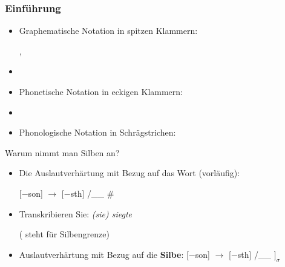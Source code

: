 \begin{frame}
\frametitle{Einführung}


\begin{itemize}
	\item Graphematische Notation in spitzen Klammern: 
	
	  \ea
          , 
          \z
          
	\item[]	
	\item Phonetische Notation in eckigen Klammern:
	
	  \ea
          \textipa{[nO5t.vInt]}
	  \z
          
	\item[]
	\item Phonologische Notation in Schrägstrichen:
	
	  \ea
	  \z
\end{itemize}

\end{frame}



\begin{frame}


Warum nimmt man Silben an?

\begin{itemize}
	\item Die Auslautverhärtung mit Bezug auf das Wort (vorläufig):
	
	  \ea
             {}[$-$son] $\rightarrow$ [$-$sth] /\_\_ \#
	     \z
	\item Transkribieren Sie: \emph{(sie) siegte}

\pause	
\ea
\textipa{[zi:k . t@]} ( steht für Silbengrenze)
\z

\pause
	\eal 
	\ex \textipa{[St\textscr e:p.za:m]} \vs \textipa{[St\textscr e:.b5]}
	\ex {} \vs \textipa{[bUn.d@s]}
	\ex \textipa{[bi:k.za:m]} \vs \textipa{[bi:.g@n]}
	\ex \textipa{[le:s.b5]} \vs \textipa{[le:.z@n]}
        \zl
        
	\item Auslautverhärtung mit Bezug auf die \textbf{Silbe}:
	  \ea
             {}[$-$son] $\rightarrow$ [$-$sth] /\_\_ $]_{\sigma}$
	  \z	
\end{itemize}


\end{frame}



